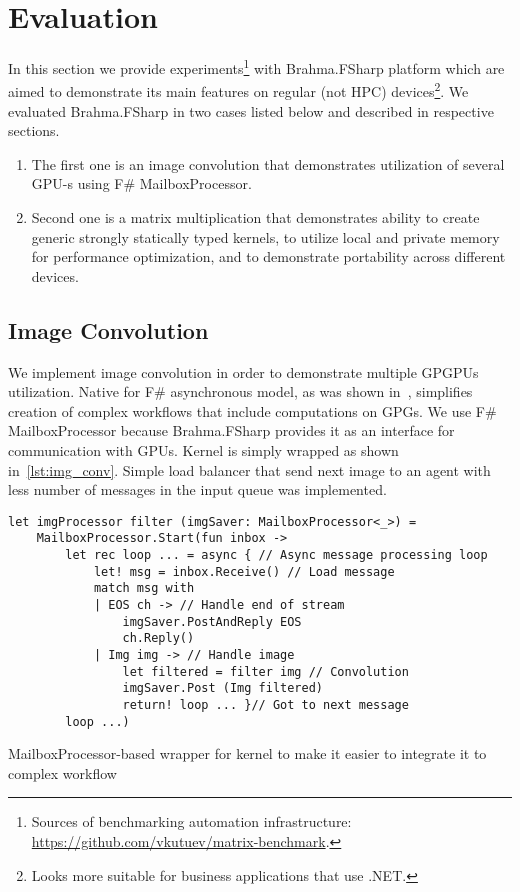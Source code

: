 \section{Evaluation}

In this section we provide experiments\footnote{Sources of benchmarking automation infrastructure: \url{https://github.com/vkutuev/matrix-benchmark}.} with Brahma.FSharp platform which are aimed to demonstrate its main features on regular (not HPC) devices\footnote{Looks more suitable for business applications that use .NET.}. 
We evaluated Brahma.FSharp in two cases listed below and described in respective sections.
\begin{enumerate}
\item The first one is an image convolution that demonstrates utilization of several GPU-s using F\# MailboxProcessor.
\item Second one is a matrix multiplication that demonstrates ability to create generic strongly statically typed kernels, to utilize local and private memory for performance optimization, and to demonstrate portability across different devices.
\end{enumerate}


\subsection{Image Convolution}

We implement image convolution in order to demonstrate multiple GPGPUs utilization.
Native for F\# asynchronous model, as was shown in~\cite{aleaGPUasync}, simplifies creation of complex workflows that include computations on GPGs.
We use F\# MailboxProcessor because Brahma.FSharp provides it as an interface for communication with GPUs.
Kernel is simply wrapped as shown in~\ref{lst:img_conv}. 
Simple load balancer that send next image to an agent with less number of messages in the input queue was implemented.

\begin{listing}[h]
  \begin{verbatim}
let imgProcessor filter (imgSaver: MailboxProcessor<_>) =
    MailboxProcessor.Start(fun inbox ->
        let rec loop ... = async { // Async message processing loop
            let! msg = inbox.Receive() // Load message
            match msg with
            | EOS ch -> // Handle end of stream
                imgSaver.PostAndReply EOS
                ch.Reply()
            | Img img -> // Handle image
                let filtered = filter img // Convolution
                imgSaver.Post (Img filtered)
                return! loop ... }// Got to next message
        loop ...)
  \end{verbatim}
  \caption{MailboxProcessor-based wrapper for kernel to make it easier to integrate it to complex workflow}
  \label{lst:img_conv}
\end{listing}

